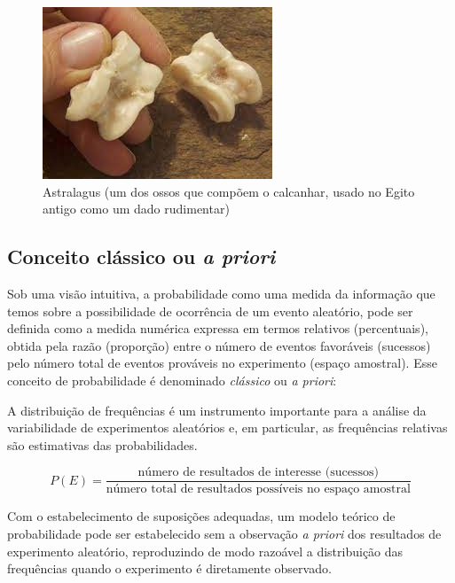 \documentclass[
]{book}
\begin{document}
\begin{figure}

{\centering \includegraphics[width=0.8\linewidth]{images4/astralagus} 

}

\caption{Astralagus (um dos ossos que compõem o calcanhar, usado no Egito antigo como um dado rudimentar)}\label{fig:unnamed-chunk-67}
\end{figure}

\hypertarget{conceito-cluxe1ssico-ou-a-priori}{%
\subsection{\texorpdfstring{Conceito clássico ou \emph{a priori}}{Conceito clássico ou a priori}}\label{conceito-cluxe1ssico-ou-a-priori}}

Sob uma visão intuitiva, a probabilidade como uma medida da informação que temos sobre a possibilidade de ocorrência de um evento aleatório, pode ser definida como a medida numérica expressa em termos relativos (percentuais), obtida pela razão (proporção) entre o número de eventos favoráveis (sucessos) pelo número total de eventos prováveis no experimento (espaço amostral). Esse conceito de probabilidade é denominado \emph{clássico} ou \emph{a priori}:

A distribuição de frequências é um instrumento importante para a análise da variabilidade de experimentos aleatórios e, em particular, as frequências relativas são estimativas das probabilidades.

\[
P(E)= \frac{\text{número de resultados de interesse (sucessos)}}{\text{número total de resultados possíveis no espaço amostral}}
\]

Com o estabelecimento de suposições adequadas, um modelo teórico de probabilidade pode ser estabelecido sem a observação \emph{a priori} dos resultados de experimento aleatório, reproduzindo de modo razoável a distribuição das frequências quando o experimento é diretamente observado.
\end{document}

